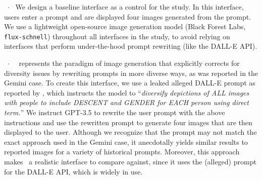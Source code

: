 






\textbf{\baselinebox}~$\cdot$~
We design a baseline interface as a control for the study. In this interface, users enter a prompt and are displayed four images generated from the prompt.
We use a lightweight open-source image generation model (Black Forest Labs, \verb|flux-schnell|) throughout all interfaces in the study, to avoid relying on interfaces that perform under-the-hood prompt rewriting (like the DALL-E API).

\textbf{\diversebox}~$\cdot$~
\diverse~represents the paradigm of image generation that explicitly corrects for diversity issues by rewriting prompts in more diverse ways, as was reported in the Gemini case. 
To create this interface, we use a leaked alleged DALL-E prompt as reported by \cite{milmoandkern2024gemini}, which instructs the model to ``\textit{diversify depictions of ALL images with people to include DESCENT and GENDER for EACH person using direct term.}''
We instruct GPT-3.5 to rewrite the user prompt with the above instructions and use the rewritten prompt to generate four images that are then displayed to the user.
Although we recognize that the prompt may not match the exact approach used in the Gemini case, it anecdotally yields similar results to reported images for a variety of historical prompts.
Moreover, this approach makes \diverse~a realistic interface to compare against, since it uses the (alleged) prompt for the DALL-E API, which is widely in use.



